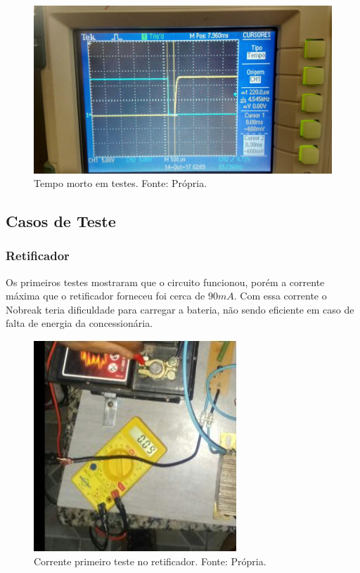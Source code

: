         \begin{figure}[!htb]
            \centering
            \includegraphics[scale= 0.2]{figuras/Tempo_morto.jpg}
            \caption{Tempo morto em testes. Fonte: Própria.}
            \label{tempo-morto}
        \end{figure}


\subsection[Casos de Teste]{Casos de Teste}
    \subsubsection[Retificador]{Retificador}       
       Os primeiros testes mostraram que o circuito funcionou, porém a corrente 						máxima que o retificador forneceu foi cerca de $90mA$. Com essa corrente o 						Nobreak teria dificuldade para carregar a bateria, não sendo eficiente em caso 				de falta de energia da concessionária. 
        
        \begin{figure}[!htb]
            \centering
            \includegraphics[scale= 0.6]{figuras/corrente_retificador.jpeg}
            \caption{Corrente primeiro teste no retificador. Fonte: Própria.}
            \label{corrente-retificador}
        \end{figure}            	
     
